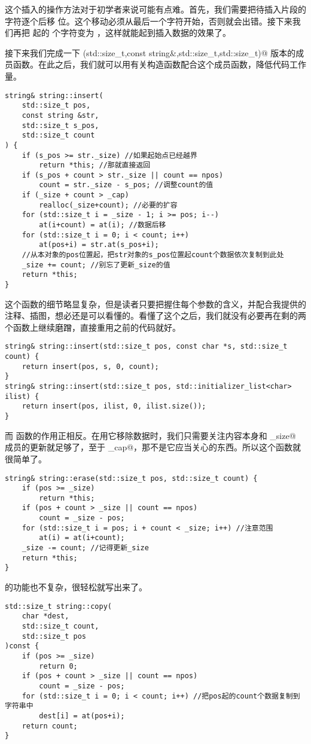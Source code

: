 这个插入的操作方法对于初学者来说可能有点难。首先，我们需要把待插入片段的字符逐个后移 \lstinline@count@ 位。这个移动必须从最后一个字符开始，否则就会出错。接下来我们再把 \lstinline@pos@ 起的 \lstinline@count@ 个字符变为 \lstinline@ch@，这样就能起到插入数据的效果了。\par
接下来我们完成一下 \lstinline@(std::size_t,const string&,std::size_t,std::size_t)@ 版本的成员函数。在此之后，我们就可以用有关构造函数配合这个成员函数，降低代码工作量。
\begin{lstlisting}
string& string::insert(
    std::size_t pos,
    const string &str,
    std::size_t s_pos,
    std::size_t count
) {
    if (s_pos >= str._size) //如果起始点已经越界
        return *this; //那就直接返回
    if (s_pos + count > str._size || count == npos)
        count = str._size - s_pos; //调整count的值
    if (_size + count > _cap)
        realloc(_size+count); //必要的扩容
    for (std::size_t i = _size - 1; i >= pos; i--)
        at(i+count) = at(i); //数据后移
    for (std::size_t i = 0; i < count; i++)
        at(pos+i) = str.at(s_pos+i);
    //从本对象的pos位置起，把str对象的s_pos位置起count个数据依次复制到此处
    _size += count; //别忘了更新_size的值
    return *this;
}
\end{lstlisting}
这个函数的细节略显复杂，但是读者只要把握住每个参数的含义，并配合我提供的注释、插图，想必还是可以看懂的。看懂了这个之后，我们就没有必要再在剩的两个函数上继续磨蹭，直接重用之前的代码就好。
\begin{lstlisting}
string& string::insert(std::size_t pos, const char *s, std::size_t count) {
    return insert(pos, s, 0, count);
}
string& string::insert(std::size_t pos, std::initializer_list<char> ilist) {
    return insert(pos, ilist, 0, ilist.size());
}
\end{lstlisting}\par
而 \lstinline@erase@ 函数的作用正相反。在用它移除数据时，我们只需要关注内容本身和 \lstinline@_size@ 成员的更新就足够了，至于 \lstinline@_cap@，那不是它应当关心的东西。所以这个函数就很简单了。
\begin{lstlisting}
string& string::erase(std::size_t pos, std::size_t count) {
    if (pos >= _size)
        return *this;
    if (pos + count > _size || count == npos)
        count = _size - pos;
    for (std::size_t i = pos; i + count < _size; i++) //注意范围
        at(i) = at(i+count);
    _size -= count; //记得更新_size
    return *this;
}
\end{lstlisting}
\lstinline@copy@ 的功能也不复杂，很轻松就写出来了。
\begin{lstlisting}
std::size_t string::copy(
    char *dest,
    std::size_t count,
    std::size_t pos
)const {
    if (pos >= _size)
        return 0;
    if (pos + count > _size || count == npos)
        count = _size - pos;
    for (std::size_t i = 0; i < count; i++) //把pos起的count个数据复制到字符串中
        dest[i] = at(pos+i);
    return count;
}
\end{lstlisting}\par
